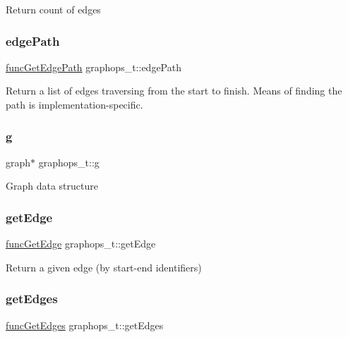 Return count of edges \mbox{\label{structgraphops__t_ab0fdace070db2a1fa199e920b6136a04}} 
\subsubsection{\texorpdfstring{edge\+Path}{edgePath}}
{\footnotesize\ttfamily \hyperlink{graphops_8h_ac2b0381c5a4018e52104e27c57fb5c2c}{func\+Get\+Edge\+Path} graphops\+\_\+t\+::edge\+Path}

Return a list of edges traversing from the start to finish. Means of finding the path is implementation-\/specific. \mbox{\label{structgraphops__t_ab8a78cf4f0bdfe6a65aa217a716ca537}} 
\subsubsection{\texorpdfstring{g}{g}}
{\footnotesize\ttfamily graph$\ast$ graphops\+\_\+t\+::g}

Graph data structure \mbox{\label{structgraphops__t_aafbe3ec7bdce040b86d7748c953cf607}} 
\subsubsection{\texorpdfstring{get\+Edge}{getEdge}}
{\footnotesize\ttfamily \hyperlink{graphops_8h_aed109d4861cfae4ea7721603770befca}{func\+Get\+Edge} graphops\+\_\+t\+::get\+Edge}

Return a given edge (by start-\/end identifiers) \mbox{\label{structgraphops__t_a87fec7e1150c05e54e34ab09fe401eaa}} 
\subsubsection{\texorpdfstring{get\+Edges}{getEdges}}
{\footnotesize\ttfamily \hyperlink{graphops_8h_af1e618623a0855f489ac957e5ae24ac0}{func\+Get\+Edges} graphops\+\_\+t\+::get\+Edges}

